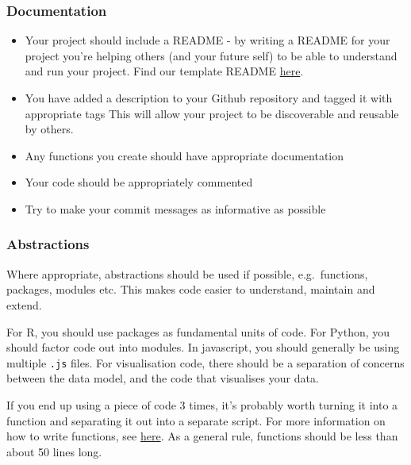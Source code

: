 \documentclass[]{book}
\begin{document}
\hypertarget{readme}{%
\subsubsection*{Documentation}\label{readme}}

\begin{itemize}
\item
  Your project should include a README - by writing a README for your project you're helping others (and your future self) to be able to understand and run your project. Find our template README \href{https://github.com/moj-analytical-services/our-coding-standards/blob/master/README_template.md}{here}.
\item
  You have added a description to your Github repository and tagged it with appropriate tags This will allow your project to be discoverable and reusable by others.
\item
  Any functions you create should have appropriate documentation
\item
  Your code should be appropriately commented
\item
  Try to make your commit messages as informative as possible
\end{itemize}

\hypertarget{functions}{%
\subsubsection*{Abstractions}\label{functions}}

Where appropriate, abstractions should be used if possible, e.g.~functions, packages, modules etc. This makes code easier to understand, maintain and extend.

For R, you should use packages as fundamental units of code. For Python, you should factor code out into modules. In javascript, you should generally be using multiple \texttt{.js} files. For visualisation code, there should be a separation of concerns between the data model, and the code that visualises your data.

If you end up using a piece of code 3 times, it's probably worth turning it into a function and separating it out into a separate script. For more information on how to write functions, see \href{https://github.com/moj-analytical-services/writing_functions_in_r}{here}. As a general rule, functions should be less than about 50 lines long.
\end{document}
